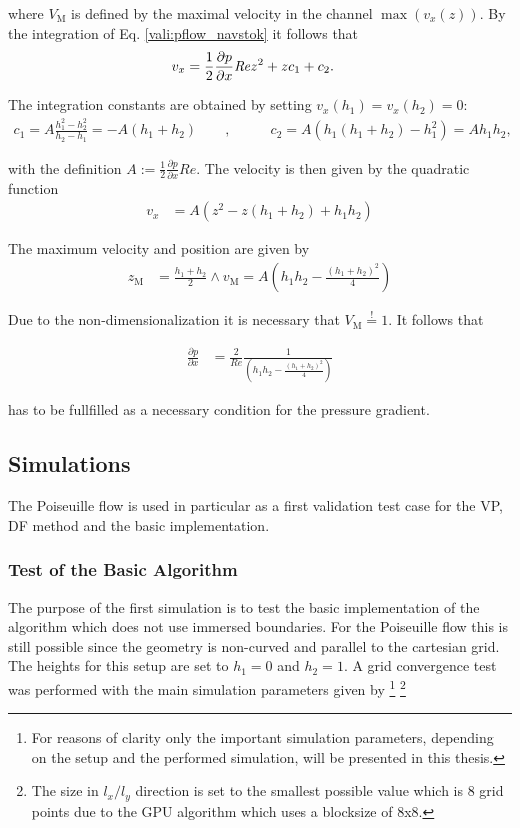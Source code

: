 where $V_\text{M}$ is defined by the maximal velocity in the channel $\max(v_x(z))$.
By the integration of Eq. \ref{vali:pflow_navstok} it follows that
\begin{align}
v_x &= \frac{1}{2}\frac{\partial p}{\partial x}\mbox{\textit{Re}} z^2 + zc_1 + c_2.
\end{align}

The integration constants are obtained by setting $v_x(h_1) = v_x(h_2) = 0$:
\begin{align}
c_1 = A\frac{h_1^2 -h_2^2}{h_2 - h_1} = -A(h_1+h_2)\qquad ,& \qquad
c_2 = A(h_1(h_1 + h_2) - h_1^2) = Ah_1h_2,
\end{align}

with the definition $A:=\frac{1}{2}\frac{\partial p}{\partial x} Re$.
The velocity is then given by the quadratic function
\begin{align}
\label{vali:pflow_theosol}
v_x &= A(z^2 - z(h_1 + h_2) + h_1h_2)
\end{align}

The maximum velocity and position are given by
\begin{align}
z_{\text{M}} &= \frac{h_1+h_2}{2} \wedge v_{\text{M}} = A\left(h_1h_2 - \frac{(h_1 + h_2)^2}{4}\right)
\end{align}

Due to the non-dimensionalization it is necessary that $V_{\text{M}} \overset{!}{=}  1$.
It follows that

\begin{align}
    \label{vali:pflow_pcondi}
\frac{\partial p}{\partial x} &= \frac{2}{Re}\frac{1}{\left(h_1h_2 - \frac{(h_1+h_2)^2}{4} \right)}
\end{align}

has to be fullfilled as a necessary condition for the pressure gradient.

\subsection{Simulations}

The Poiseuille flow is used in particular as a first validation test case
for the VP, DF method  and the basic implementation.

\subsubsection{Test of the Basic Algorithm}

The purpose of the first simulation is to test  the basic
implementation of the algorithm which does not use immersed boundaries.
For the Poiseuille flow this is still possible since the geometry is non-curved
and parallel to the cartesian grid. The heights for this setup are set to $h_1=0$ and $h_2=1$.
A grid convergence test was performed with the main simulation parameters given by
\footnote{For reasons of clarity only the important simulation parameters, depending on the setup and the performed simulation,  will be presented in this thesis.}
\footnote{The size in $l_x/l_y$ direction is set to the smallest possible value which is 8 grid points due to the GPU algorithm which uses a blocksize of 8x8.}

